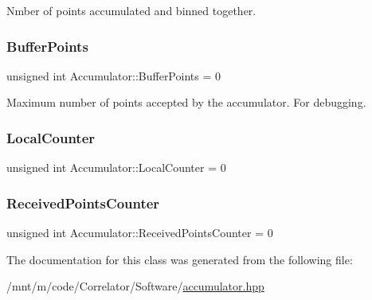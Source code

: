 Nmber of points accumulated and binned together. 

\mbox{\label{classAccumulator_a559e4fac031df015e47248599740b33c}} 
\subsubsection{\texorpdfstring{Buffer\+Points}{BufferPoints}}
{\footnotesize\ttfamily unsigned int Accumulator\+::\+Buffer\+Points = 0\hspace{0.3cm}{\ttfamily [private]}}



Maximum number of points accepted by the accumulator. For debugging. 

\mbox{\label{classAccumulator_a753e3878c3078a11ee9bc13b6185ec60}} 
\subsubsection{\texorpdfstring{Local\+Counter}{LocalCounter}}
{\footnotesize\ttfamily unsigned int Accumulator\+::\+Local\+Counter = 0\hspace{0.3cm}{\ttfamily [private]}}

\mbox{\label{classAccumulator_a9cc7c392e99778c99593f7798cb2ab3b}} 
\subsubsection{\texorpdfstring{Received\+Points\+Counter}{ReceivedPointsCounter}}
{\footnotesize\ttfamily unsigned int Accumulator\+::\+Received\+Points\+Counter = 0\hspace{0.3cm}{\ttfamily [private]}}



The documentation for this class was generated from the following file\+:\begin{DoxyCompactItemize}
\item 
/mnt/m/code/\+Correlator/\+Software/\hyperlink{accumulator_8hpp}{accumulator.\+hpp}\end{DoxyCompactItemize}
